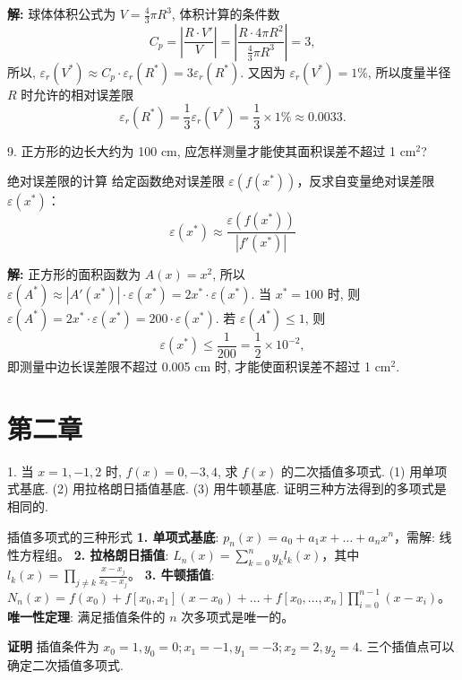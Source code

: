 \documentclass[a4paper,11pt]{ctexart}
\begin{document}
\textbf{解: } 球体体积公式为 $V = \frac{4}{3}\pi R^3$, 体积计算的条件数
\[
C_p = \left| \frac{R \cdot V'}{V} \right| = \left| \frac{R \cdot 4\pi R^2}{\frac{4}{3}\pi R^3} \right| = 3,
\]
所以, $\varepsilon_r(V^*) \approx C_p \cdot \varepsilon_r(R^*) = 3 \varepsilon_r(R^*)$.
又因为 $\varepsilon_r(V^*) = 1\%$, 所以度量半径 $R$ 时允许的相对误差限
\[
\varepsilon_r(R^*) = \frac{1}{3} \varepsilon_r(V^*) = \frac{1}{3} \times 1\% \approx 0.0033.
\]

\vspace{2em}

9. 正方形的边长大约为 100 cm, 应怎样测量才能使其面积误差不超过 1 $\text{cm}^2$?

\begin{theorybox}{绝对误差限的计算}
给定函数绝对误差限 $\varepsilon(f(x^*))$，反求自变量绝对误差限 $\varepsilon(x^*)$：
\[ \varepsilon(x^*) \approx \frac{\varepsilon(f(x^*))}{|f'(x^*)|} \]
\end{theorybox}

\textbf{解: } 正方形的面积函数为 $A(x) = x^2$, 所以 $\varepsilon(A^*) \approx |A'(x^*)| \cdot \varepsilon(x^*) = 2x^* \cdot \varepsilon(x^*)$.
当 $x^* = 100$ 时, 则 $\varepsilon(A^*) = 2x^* \cdot \varepsilon(x^*) = 200 \cdot \varepsilon(x^*)$. 若 $\varepsilon(A^*) \leqslant 1$, 则
\[
\varepsilon(x^*) \leqslant \frac{1}{200} = \frac{1}{2} \times 10^{-2},
\]
即测量中边长误差限不超过 0.005 cm 时, 才能使面积误差不超过 1 $\text{cm}^2$.

\newpage

\section{第二章}

1. 当 $x = 1, -1, 2$ 时, $f(x) = 0, -3, 4$, 求 $f(x)$ 的二次插值多项式.
(1) 用单项式基底.
(2) 用拉格朗日插值基底.
(3) 用牛顿基底.
证明三种方法得到的多项式是相同的.

\begin{theorybox}{插值多项式的三种形式}
\textbf{1. 单项式基底}: $p_n(x) = a_0 + a_1 x + \dots + a_n x^n$，需解: 线性方程组。
\textbf{2. 拉格朗日插值}: $L_n(x) = \sum_{k=0}^n y_k l_k(x)$，其中 $l_k(x) = \prod_{j \neq k} \frac{x-x_j}{x_k-x_j}$。
\textbf{3. 牛顿插值}: $N_n(x) = f(x_0) + f[x_0,x_1](x-x_0) + \dots + f[x_0,\dots,x_n]\prod_{i=0}^{n-1}(x-x_i)$。
\textbf{唯一性定理}: 满足插值条件的 $n$ 次多项式是唯一的。
\end{theorybox}

\textbf{证明} 插值条件为 $x_0 = 1, y_0 = 0; x_1 = -1, y_1 = -3; x_2 = 2, y_2 = 4$. 三个插值点可以确定二次插值多项式.
\end{document}
